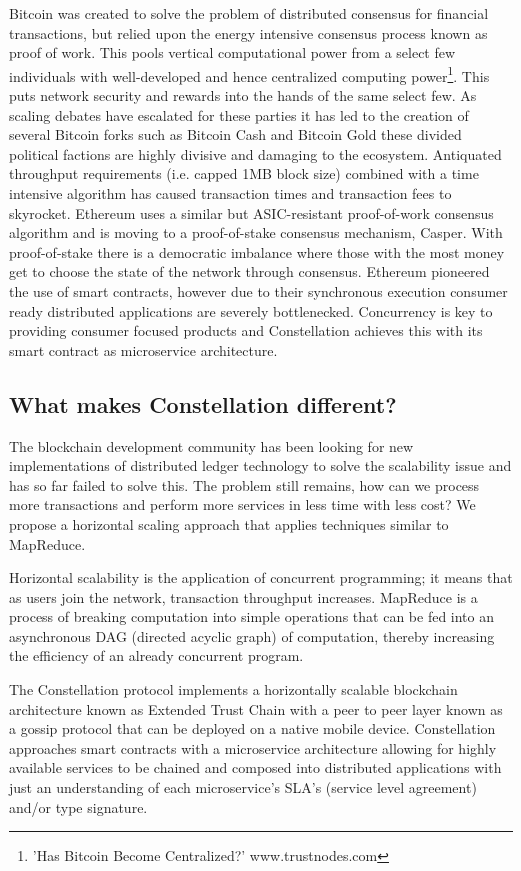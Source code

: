 \documentclass{article}
\begin{document}
Bitcoin was created to solve the problem of distributed consensus for financial transactions, but relied upon the energy intensive consensus process known as proof of work. This pools vertical computational power from a select few individuals with well-developed and hence centralized computing power\footnote{'Has Bitcoin Become Centralized?' www.trustnodes.com}. This puts network security and rewards into the hands of the same select few. As scaling debates have escalated for these parties it has led to the creation of several Bitcoin forks such as Bitcoin Cash and Bitcoin Gold these divided political factions are highly divisive and damaging to the ecosystem. Antiquated throughput requirements (i.e. capped 1MB block size) combined with a time intensive algorithm has caused transaction times and transaction fees to skyrocket. Ethereum uses a similar but ASIC-resistant proof-of-work consensus algorithm and is  moving to a proof-of-stake consensus mechanism, Casper.  With proof-of-stake there is a democratic imbalance where those with the most money get to choose the state of the network through consensus. Ethereum pioneered the use of smart contracts, however due to their synchronous execution consumer ready distributed applications are severely bottlenecked. Concurrency is key to providing consumer focused products and Constellation achieves this with its smart contract as microservice architecture.

\subsection{What makes Constellation different?}
The blockchain development community has been looking for new implementations of distributed ledger technology to solve the scalability issue and has so far failed to solve this. The problem still remains, how can we process more transactions and perform more services in less time with less cost? We propose a horizontal scaling approach that applies techniques similar to MapReduce.  

Horizontal scalability is the application of concurrent programming; it means that as users join the network, transaction throughput increases. MapReduce is a process of breaking computation into simple operations that can be fed into an asynchronous DAG (directed acyclic graph) of computation, thereby increasing the efficiency of an already concurrent program. 

The Constellation protocol implements a horizontally scalable blockchain architecture known as Extended Trust Chain with a peer to peer layer known as a gossip protocol that can be deployed on a native mobile device. Constellation approaches smart contracts with a microservice architecture allowing for highly available services to be chained and composed into distributed applications with just an understanding of each microservice's SLA's (service level agreement) and/or type signature.
\end{document}
